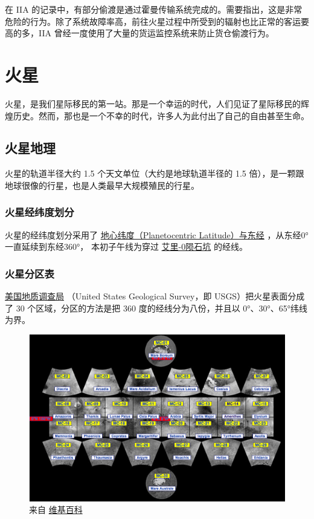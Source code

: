 \documentclass[letterpaper,10pt]{sphinxmanual}
\begin{document}
在 IIA 的记录中，有部分偷渡是通过霍曼传输系统完成的。需要指出，这是非常危险的行为。除了系统故障率高，前往火星过程中所受到的辐射也比正常的客运要高的多，IIA 曾经一度使用了大量的货运监控系统来防止货仓偷渡行为。


\section{火星}
\label{mars::doc}\label{mars:id1}
火星，是我们星际移民的第一站。那是一个幸运的时代，人们见证了星际移民的辉煌历史。然而，那也是一个不幸的时代，许多人为此付出了自己的自由甚至生命。


\subsection{火星地理}
\label{mars:id2}
火星的轨道半径大约 1.5 个天文单位（大约是地球轨道半径的 1.5 倍），是一颗跟地球很像的行星，也是人类最早大规模殖民的行星。
\begin{figure}[htbp]
\centering
\end{figure}


\subsubsection{火星经纬度划分}
\label{mars:id3}
火星的经纬度划分采用了 \href{http://en.wikipedia.org/wiki/Longitude\#Longitude\_on\_bodies\_other\_than\_Earth}{地心纬度（Planetocentric Latitude）与东经} ，从东经0°一直延续到东经360°，
本初子午线为穿过 \href{http://en.wikipedia.org/wiki/Airy-0}{艾里-0陨石坑} 的经线。


\subsubsection{火星分区表}
\label{mars:id5}
\href{http://zh.wikipedia.org/zh-cn/\%E7\%BE\%8E\%E5\%9C\%8B\%E5\%9C\%B0\%E8\%B3\%AA\%E8\%AA\%BF\%E6\%9F\%A5\%E5\%B1\%80}{美国地质调查局} （United States Geological Survey，即 USGS）把火星表面分成了 30 个区域，分区的方法是把 360 度的经线分为八份，并且以 0°、30°、65°纬线为界。
\begin{figure}[htbp]
\centering
\capstart

\includegraphics{USGSMarsSection.png}
\caption{来自 \href{http://en.wikipedia.org/wiki/Geography\_of\_Mars\#Map\_of\_quadrangles}{维基百科}}\end{figure}
\end{document}

